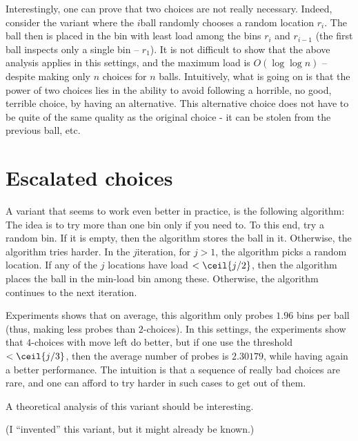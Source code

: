 Interestingly, one can prove that two choices are not really
necessary. Indeed, consider the variant where the $i$\th ball randomly
chooses a random location $r_i$. The ball then is placed in the bin
with least load among the bins $r_i$ and $r_{i-1}$ (the first ball
inspects only a single bin -- $r_1$). It is not difficult to show that
the above analysis applies in this settings, and the maximum load is
$O( \log \log n)$ -- despite making only $n$ choices for $n$
balls. Intuitively, what is going on is that the power of two choices
lies in the ability to avoid following a horrible, no good, terrible
choice, by having an alternative. This alternative choice does not
have to be quite of the same quality as the original choice - it can
be stolen from the previous ball, etc.



\section{Escalated choices}

A variant that seems to work even better in practice, is the following
 algorithm: The idea is to try more than one
bin only if you need to. To this end, try a random bin. If it is
empty, then the algorithm stores the ball in it. Otherwise, the
algorithm tries harder. In the $j$\th iteration, for $j >1$, the
algorithm picks a random location. If any of the $j$ locations have
load $< \ceil{j/2}$, then the algorithm places the ball in the
min-load bin among these. Otherwise, the algorithm continues to the
next iteration.

Experiments shows that on average, this algorithm only probes $1.96$
bins per ball (thus, making less probes than $2$-choices). In this
settings, the experiments show that $4$-choices with move left do
better, but if one use the threshold $< \ceil{j/3}$, then the average
number of probes is $2.30179$, while having again a better
performance. The intuition is that a sequence of really bad choices
are rare, and one can afford to try harder in such cases to get out of
them.

A theoretical analysis of this variant should be interesting.

(I ``invented'' this variant, but it might already be known.)

